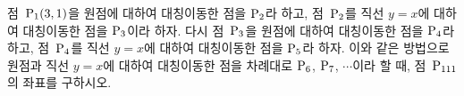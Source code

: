 점~$\mathrm{P}_1(3{,}\mkern3mu\mathopen{}1)$을 원점에 대하여 대칭이동한 점을 $\mathrm{P}_2$라 하고, 점~$\mathrm{P}_2$를 직선 $y=x$에 대하여 대칭이동한 점을 $\mathrm{P}_3$이라 하자. 다시 점~$\mathrm{P}_3$을 원점에 대하여 대칭이동한 점을 $\mathrm{P}_4$라 하고, 점~$\mathrm{P}_4$를 직선 $y=x$에 대하여 대칭이동한 점을 $\mathrm{P}_5$라 하자. 이와 같은 방법으로 원점과 직선 $y=x$에 대하여 대칭이동한 점을 차례대로 $\mathrm{P}_6$, $\mathrm{P}_7$, $\cdots$이라 할 때, 점~$\mathrm{P}_{111}$의 좌표를 구하시오.
